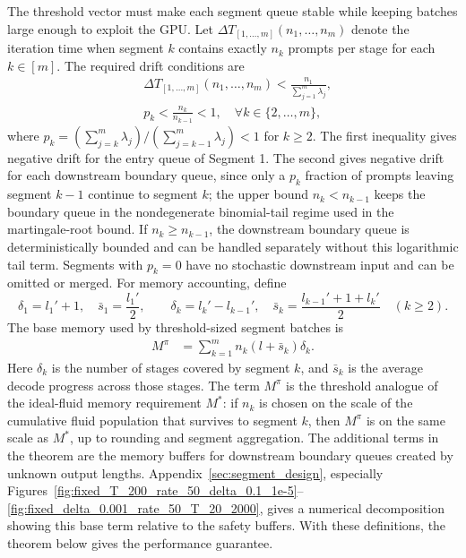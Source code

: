 The threshold vector must make each segment queue stable while keeping batches large enough to exploit the GPU. Let \(\Delta T_{[1,\dots,m]}(n_1,\dots,n_m)\) denote the iteration time when segment \(k\) contains exactly \(n_k\) prompts per stage for each \(k\in[m]\). The required drift conditions are
\begin{equation}
    \label{eq:nested_wait_thresholds}
    \begin{aligned}
    &\Delta T_{[1,\dots,m]}(n_1, \dots, n_m) <\frac{n_1}{\sum_{j=1}^m \lambda_j}, \\
    &p_k < \frac{n_k}{n_{k-1}} < 1,\quad \forall k \in \{2, \dots, m\},
    \end{aligned}
\end{equation}
where \(p_k = (\sum_{j=k}^m\lambda_j)/(\sum_{j=k-1}^m\lambda_j)<1\) for \(k\ge2\). The first inequality gives negative drift for the entry queue of Segment 1. The second gives negative drift for each downstream boundary queue, since only a \(p_k\) fraction of prompts leaving segment \(k-1\) continue to segment \(k\); the upper bound \(n_k<n_{k-1}\) keeps the boundary queue in the nondegenerate binomial-tail regime used in the martingale-root bound. If \(n_k\ge n_{k-1}\), the downstream boundary queue is deterministically bounded and can be handled separately without this logarithmic tail term. Segments with \(p_k=0\) have no stochastic downstream input and can be omitted or merged. For memory accounting, define
\[
\delta_1=l_1'+1,\quad \bar s_1=\frac{l_1'}{2},\qquad
\delta_k=l_k'-l_{k-1}',\quad \bar s_k=\frac{l_{k-1}'+1+l_k'}{2}\quad (k\ge2).
\]
The base memory used by threshold-sized segment batches is
\begin{equation}
    \label{eq:nested_wait_memory}
\begin{aligned}
        M^\pi &= \sum_{k=1}^m n_k (l+\bar s_k)\delta_k .
\end{aligned}
\end{equation}
Here \(\delta_k\) is the number of stages covered by segment \(k\), and \(\bar s_k\) is the average decode progress across those stages. The term \(M^\pi\) is the threshold analogue of the ideal-fluid memory requirement \(M^*\): if \(n_k\) is chosen on the scale of the cumulative fluid population that survives to segment \(k\), then \(M^\pi\) is on the same scale as \(M^*\), up to rounding and segment aggregation. The additional terms in the theorem are the memory buffers for downstream boundary queues created by unknown output lengths. Appendix~\ref{sec:segment_design}, especially Figures~\ref{fig:fixed_T_200_rate_50_delta_0.1_1e-5}--\ref{fig:fixed_delta_0.001_rate_50_T_20_2000}, gives a numerical decomposition showing this base term relative to the safety buffers. With these definitions, the theorem below gives the performance guarantee.

